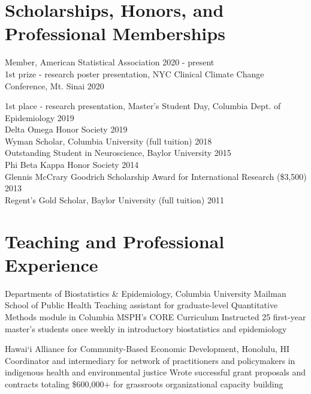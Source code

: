 \documentclass[hidelinks,10pt]{my_cv}
\begin{document}
\section{Scholarships, Honors, and Professional Memberships}
	
	{Member, American Statistical Association   \hfill 2020 - present}
	\\{1st prize - research poster presentation, NYC Clinical Climate Change Conference, Mt. Sinai \hfill 2020}
	\\{1st place - research presentation, Master's Student Day, Columbia Dept. of Epidemiology \hfill 2019
	\\{Delta Omega Honor Society \hfill 2019}
	\\{Wyman Scholar, Columbia University (full tuition) \hfill 2018}  %
	\\{Outstanding Student in Neuroscience, Baylor University \hfill 2015}
	\\{Phi Beta Kappa Honor Society \hfill 2014}
	\\{Glennis McCrary Goodrich Scholarship Award for International Research (\$3,500) \hfill 2013}
	\\{Regent's Gold Scholar, Baylor University (full tuition) \hfill 2011}  %



\section{Teaching and Professional Experience}

	{Departments of Biostatistics \& Epidemiology, Columbia University Mailman School of Public Health}
	\subitemss
		{Teaching assistant for graduate-level Quantitative Methods module in Columbia MSPH's CORE Curriculum}
		{Instructed 25 first-year master's students once weekly in introductory biostatistics and epidemiology}

	{Hawai`i Alliance for Community-Based Economic Development, Honolulu, HI}
	\subitemss
		{Coordinator and intermediary for network of practitioners and policymakers in indigenous health and environmental justice}
		{Wrote successful grant proposals and contracts totaling \$600,000+ for grassroots organizational capacity building}

}
\end{document}
